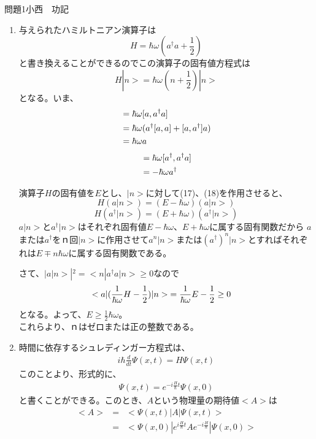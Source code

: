 \documentclass[fleqn]{jbook}
\begin{document}
\begin{answer}{問題1}{小西　功記}
\begin{enumerate}
\item 与えられたハミルトニアン演算子は
\begin{equation}
H=\hbar \omega(a^{\dag}a+\frac{1}{2})
\end{equation}
と書き換えることができるのでこの演算子の固有値方程式は
\begin{equation}
H|n>=\hbar \omega(n+\frac{1}{2})|n>
\end{equation}
となる。いま、
\begin{align}
[a,H]&=\hbar \omega [a,a^{\dag}a] \notag\\
	&=\hbar \omega(a^{\dag}[a,a]+[a,a^{\dag}]a) \notag\\ 
	&=\hbar \omega a 
\end{align}
\begin{align}
[a^{\dag},H]&=\hbar \omega [a^{\dag},a^{\dag}a] \notag\\
	&=-\hbar \omega a^{\dag} 
\end{align}

演算子$H$の固有値を$E$とし、$|n>$に対して(17)、(18)を作用させると、
\begin{equation}
H(a|n>)=(E-\hbar \omega)(a|n>)
\end{equation}
\begin{equation}
H(a^{\dag}|n>)=(E+\hbar \omega)(a^{\dag}|n>)
\end{equation}
$a|n>$と$a^{\dag}|n>$はそれぞれ固有値$E-\hbar \omega$、$E+\hbar \omega$に属する固有関数だから
$a$または$a^{\dag}$をｎ回$|n>$に作用させて$a^n|n>$または$(a^{\dag})^n|n>$とすればそれぞれは$E \mp n\hbar \omega$に属する固有関数である。

さて、$|a|n>|^2=<n|a^{\dag}a|n>\ge 0$なので
\begin{align}
<a|(\frac{1}{\hbar \omega}H-\frac{1}{2})|n>&=\frac{1}{\hbar \omega}E-\frac{1}{2} \ge 0 \notag
\end{align}
となる。よって、$E \ge \frac{1}{2}\hbar \omega$。\\
これらより、ｎはゼロまたは正の整数である。



\item
時間に依存するシュレディンガー方程式は、
\begin{eqnarray}
i\hbar\frac{d}{dt}\Psi(x,t)=H\Psi(x,t)
\end{eqnarray}
このことより、形式的に、
\begin{eqnarray}
\Psi(x,t)=e^{-i\frac{H}{\hbar}t}\Psi(x,0)
\end{eqnarray}
と書くことができる。このとき、$A$という物理量の期待値$<A>$は
\begin{eqnarray}
<A>&=&<\Psi(x,t)|A|\Psi(x,t)>\\
&=&<\Psi(x,0)|e^{i\frac{H}{\hbar}t} A e^{-i\frac{H}{\hbar}}|\Psi(x,0)>
\end{eqnarray}


\end{enumerate}
\end{answer}
\end{document}
